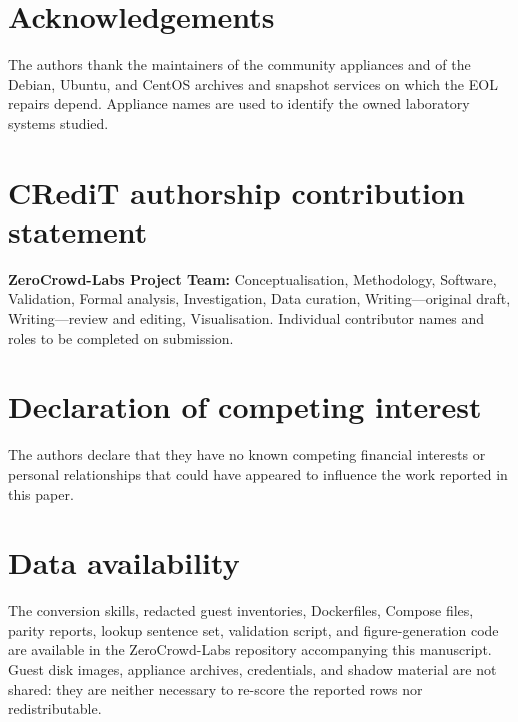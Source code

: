 \documentclass[3p,twocolumn,authoryear]{elsarticle}
\begin{document}
\section*{Acknowledgements}
The authors thank the maintainers of the community appliances and of
the Debian, Ubuntu, and CentOS archives and snapshot services on which
the EOL repairs depend. Appliance names are used to identify the owned
laboratory systems studied.

\section*{CRediT authorship contribution statement}
\textbf{ZeroCrowd-Labs Project Team:} Conceptualisation, Methodology,
Software, Validation, Formal analysis, Investigation, Data curation,
Writing---original draft, Writing---review and editing, Visualisation.
Individual contributor names and roles to be completed on submission.

\section*{Declaration of competing interest}
The authors declare that they have no known competing financial
interests or personal relationships that could have appeared to
influence the work reported in this paper.

\section*{Data availability}
The conversion skills, redacted guest inventories, Dockerfiles,
Compose files, parity reports, lookup sentence set, validation script,
and figure-generation code are available in the ZeroCrowd-Labs
repository accompanying this manuscript. Guest disk images, appliance
archives, credentials, and shadow material are not shared: they are
neither necessary to re-score the reported rows nor redistributable.
\end{document}
